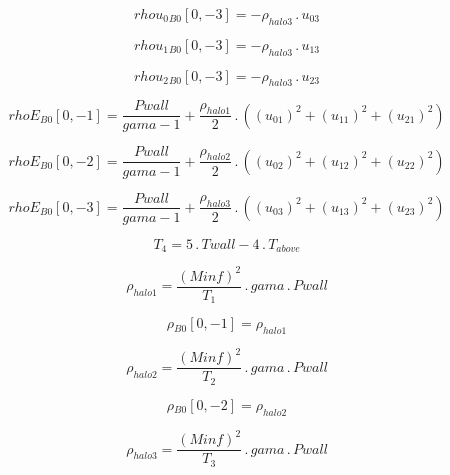 \documentclass{article}
\begin{document}
\begin{dmath}{rhou_{0}{_{B0}}}[{0,-3}] = - \rho_{halo 3} \,.\, u_{03}\end{dmath}

\begin{dmath}{rhou_{1}{_{B0}}}[{0,-3}] = - \rho_{halo 3} \,.\, u_{13}\end{dmath}

\begin{dmath}{rhou_{2}{_{B0}}}[{0,-3}] = - \rho_{halo 3} \,.\, u_{23}\end{dmath}

\begin{dmath}{rhoE{_{B0}}}[{0,-1}] = \frac{Pwall}{gama - 1} + \frac{\rho_{halo 1}}{2} \,.\, \left(\left(u_{01} \right)^{2} + \left(u_{11} \right)^{2} + \left(u_{21} \right)^{2}\right)\end{dmath}

\begin{dmath}{rhoE{_{B0}}}[{0,-2}] = \frac{Pwall}{gama - 1} + \frac{\rho_{halo 2}}{2} \,.\, \left(\left(u_{02} \right)^{2} + \left(u_{12} \right)^{2} + \left(u_{22} \right)^{2}\right)\end{dmath}

\begin{dmath}{rhoE{_{B0}}}[{0,-3}] = \frac{Pwall}{gama - 1} + \frac{\rho_{halo 3}}{2} \,.\, \left(\left(u_{03} \right)^{2} + \left(u_{13} \right)^{2} + \left(u_{23} \right)^{2}\right)\end{dmath}

\begin{dmath}T_{4} = 5 \,.\, Twall - 4 \,.\, T_{above}\end{dmath}

\begin{dmath}\rho_{halo 1} = \frac{\left(Minf \right)^{2}}{T_{1}} \,.\, gama \,.\, Pwall\end{dmath}

\begin{dmath}{\rho{_{B0}}}[{0,-1}] = \rho_{halo 1}\end{dmath}

\begin{dmath}\rho_{halo 2} = \frac{\left(Minf \right)^{2}}{T_{2}} \,.\, gama \,.\, Pwall\end{dmath}

\begin{dmath}{\rho{_{B0}}}[{0,-2}] = \rho_{halo 2}\end{dmath}

\begin{dmath}\rho_{halo 3} = \frac{\left(Minf \right)^{2}}{T_{3}} \,.\, gama \,.\, Pwall\end{dmath}
\end{document}
